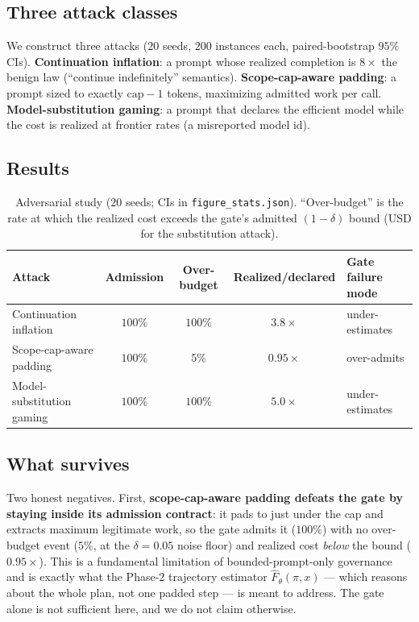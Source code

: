 \documentclass[11pt]{article}
\theoremstyle{plain}
\theoremstyle{definition}
\theoremstyle{remark}
\begin{document}
\subsection{Three attack classes}
We construct three attacks ($20$ seeds, $200$ instances each, paired-bootstrap $95\%$ CIs). \textbf{Continuation inflation}: a prompt whose realized completion is $8\times$ the benign law (``continue indefinitely'' semantics). \textbf{Scope-cap-aware padding}: a prompt sized to exactly $\text{cap}-1$ tokens, maximizing admitted work per call. \textbf{Model-substitution gaming}: a prompt that declares the efficient model while the cost is realized at frontier rates (a misreported model id).

\subsection{Results}
\begin{table}[H]
\centering\small
\begin{tabular}{@{}lcccl@{}}
\toprule
Attack & Admission & Over-budget & Realized/declared & Gate failure mode \\
\midrule
Continuation inflation & $100\%$ & $100\%$ & $3.8\times$ & under-estimates \\
Scope-cap-aware padding & $100\%$ & $5\%$ & $0.95\times$ & over-admits \\
Model-substitution gaming & $100\%$ & $100\%$ & $5.0\times$ & under-estimates \\
\bottomrule
\end{tabular}
\caption{Adversarial study ($20$ seeds; CIs in \texttt{figure\_stats.json}). ``Over-budget'' is the rate at which the realized cost exceeds the gate's admitted $(1-\delta)$ bound (USD for the substitution attack).}
\label{tab:adversarial}
\end{table}

\subsection{What survives}
Two honest negatives. First, \textbf{scope-cap-aware padding defeats the gate by staying inside its admission contract}: it pads to just under the cap and extracts maximum legitimate work, so the gate admits it ($100\%$) with no over-budget event ($5\%$, at the $\delta=0.05$ noise floor) and realized cost \emph{below} the bound ($0.95\times$). This is a fundamental limitation of bounded-prompt-only governance and is exactly what the Phase-2 trajectory estimator $\hat F_\theta(\pi,x)$ --- which reasons about the whole plan, not one padded step --- is meant to address. The gate alone is not sufficient here, and we do not claim otherwise.
\end{document}
